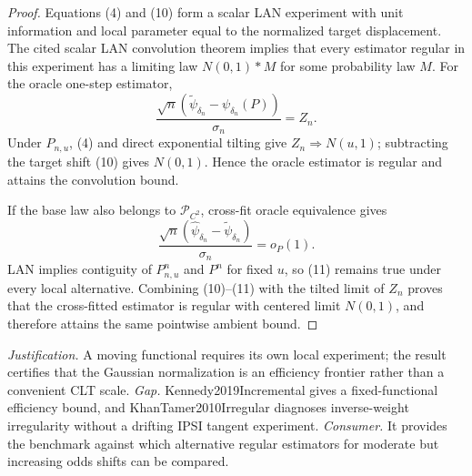 \documentclass{article}
\begin{document}
\begin{proof}
Equations (4) and (10) form a scalar LAN experiment with unit information and local parameter equal to the normalized target displacement.  The cited scalar LAN convolution theorem implies that every estimator regular in this experiment has a limiting law \(N(0,1)*M\) for some probability law \(M\).  For the oracle one-step estimator,
\[
 \frac{\sqrt n(\widetilde\psi_{\delta_n}-\psi_{\delta_n}(P))}{\sigma_n}=Z_n.
\]
Under \(P_{n,u}\), (4) and direct exponential tilting give \(Z_n\Rightarrow N(u,1)\); subtracting the target shift (10) gives \(N(0,1)\).  Hence the oracle estimator is regular and attains the convolution bound.

If the base law also belongs to \(\mathcal P_{C^2}\), cross-fit oracle equivalence gives
\[
 \frac{\sqrt n(\widehat\psi_{\delta_n}-\widetilde\psi_{\delta_n})}{\sigma_n}=o_P(1). \tag{11}
\]
LAN implies contiguity of \(P_{n,u}^n\) and \(P^n\) for fixed \(u\), so (11) remains true under every local alternative.  Combining (10)--(11) with the tilted limit of \(Z_n\) proves that the cross-fitted estimator is regular with centered limit \(N(0,1)\), and therefore attains the same pointwise ambient bound.
\end{proof}
\par\smallskip\noindent \textit{Justification.} A moving functional requires its own local experiment; the result certifies that the Gaussian normalization is an efficiency frontier rather than a convenient CLT scale. \textit{Gap.} Kennedy2019Incremental gives a fixed-functional efficiency bound, and KhanTamer2010Irregular diagnoses inverse-weight irregularity without a drifting IPSI tangent experiment. \textit{Consumer.} It provides the benchmark against which alternative regular estimators for moderate but increasing odds shifts can be compared.
\end{document}
